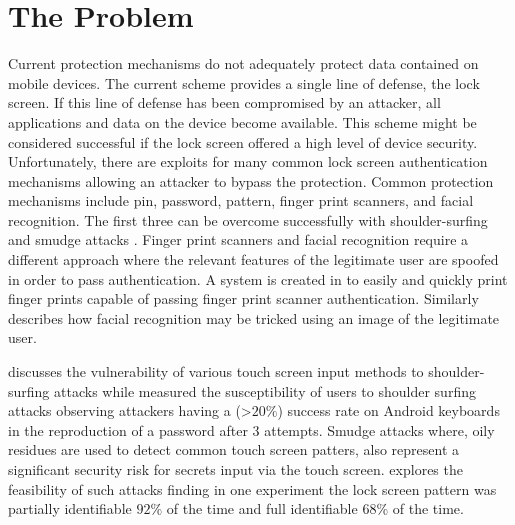 \section{The Problem}
\label{the_problem}
Current protection mechanisms do not adequately protect
data contained on mobile devices.
The current scheme provides a single line of defense,
the lock screen.
If this line of defense has been compromised
by an attacker,
all applications and data on the device become available.
%
This scheme might be considered successful 
if the lock screen offered a high level of device security.
Unfortunately, there are exploits for many common lock screen 
authentication mechanisms 
allowing an attacker to bypass the protection.
%
Common protection mechanisms include
pin, password, pattern, finger print scanners, and facial recognition.
%
The first three can be overcome successfully with 
shoulder-surfing \cite{schaub2012password} and smudge attacks \cite{aviv2010smudge}.
Finger print scanners and facial recognition require a different approach
where the relevant features of the legitimate user are spoofed
in order to pass authentication.
%
A system is created in \cite{cao2016hacking} 
to easily and quickly print finger prints
capable of passing finger print scanner authentication.
%
Similarly \cite{de2013can} describes how
facial recognition may be tricked using an image of the legitimate user.

%


\cite{schaub2012password} discusses the vulnerability of
various touch screen input methods to shoulder-surfing attacks
while
\cite{hafiz2008towards} measured the susceptibility of 
users to shoulder surfing attacks observing
attackers having a (\textgreater$20\%$) success rate
on Android keyboards
in the reproduction of a password after $3$ attempts.
%
Smudge attacks where,
oily residues are used to detect common touch screen patters,
also represent a significant security risk
for secrets input via the touch screen.
\cite{aviv2010smudge} explores the feasibility of
such attacks finding in one experiment
the lock screen pattern was partially identifiable $92\%$ of the time
and full identifiable $68\%$ of the time.

